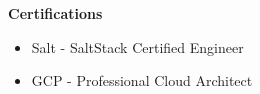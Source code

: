 
\textbf{Certifications}
\begin{itemize}
    \item Salt - SaltStack Certified Engineer
    \item GCP - Professional Cloud Architect
\end{itemize}